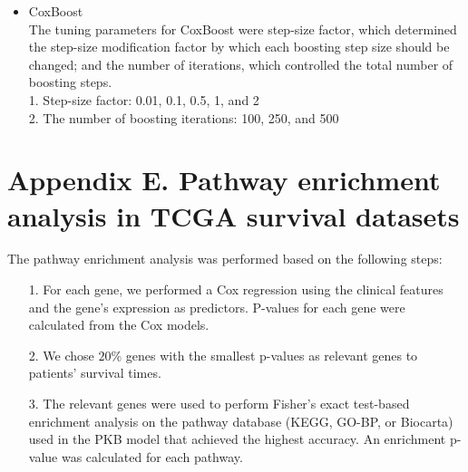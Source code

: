 \documentclass[a4paper,12pt]{article}
\begin{document}
\begin{itemize}
		\item CoxBoost\\
		The tuning parameters for CoxBoost were step-size factor, which determined the step-size modification factor by which each boosting step size should be changed; and the number of iterations, which controlled the total number of boosting steps. \\
		1.	Step-size factor: 0.01, 0.1, 0.5, 1, and 2\\
		2.	The number of boosting iterations: 100, 250, and 500 
	\end{itemize}
\newpage
\section*{Appendix E. Pathway enrichment analysis in TCGA survival datasets}\label{sec:gsea}
The pathway enrichment analysis was performed based on the following steps:
\begin{itemize}
	\item[1.] For each gene, we performed a Cox regression using the clinical features and the gene's expression as predictors. P-values for each gene were calculated from the Cox models.
	\item[2.] We chose $20\%$ genes with the smallest p-values as relevant genes to patients' survival times. 
	\item[3.] The relevant genes were used to perform Fisher's exact test-based enrichment analysis \cite{huang2008bioinformatics} on the pathway database (KEGG, GO-BP, or Biocarta) used in the PKB model that achieved the highest accuracy. An enrichment p-value was calculated for each pathway.
\end{itemize}
\end{document}

